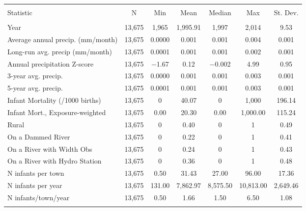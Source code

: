 
\begin{tabular}{@{\extracolsep{5pt}}lcccccc} 
\\[-1.8ex]\hline \\[-1.8ex] 
Statistic & \multicolumn{1}{c}{N} & \multicolumn{1}{c}{Min} & \multicolumn{1}{c}{Mean} & \multicolumn{1}{c}{Median} & \multicolumn{1}{c}{Max} & \multicolumn{1}{c}{St. Dev.} \\ 
\hline 
\hline \\[-1.8ex] 
Year & 13,675 & 1,965 & 1,995.91 & 1,997 & 2,014 & 9.53 \\ 
Average annual precip. (mm/month) & 13,675 & 0.0000 & 0.001 & 0.001 & 0.004 & 0.001 \\ 
Long-run avg. precip (mm/month) & 13,675 & 0.0001 & 0.001 & 0.001 & 0.002 & 0.001 \\ 
Annual precipitation Z-score & 13,675 & $-$1.67 & 0.12 & $-$0.002 & 4.99 & 0.95 \\ 
3-year avg. precip. & 13,675 & 0.0000 & 0.001 & 0.001 & 0.003 & 0.001 \\ 
5-year avg. precip. & 13,675 & 0.0001 & 0.001 & 0.001 & 0.003 & 0.001 \\ 
Infant Mortality (/1000 births) & 13,675 & 0 & 40.07 & 0 & 1,000 & 196.14 \\ 
Infant Mort., Exposure-weighted & 13,675 & 0.00 & 20.30 & 0.00 & 1,000.00 & 115.24 \\ 
Rural & 13,675 & 0 & 0.40 & 0 & 1 & 0.49 \\ 
On a Dammed River & 13,675 & 0 & 0.22 & 0 & 1 & 0.41 \\ 
On a River with Width Obs & 13,675 & 0 & 0.24 & 0 & 1 & 0.43 \\ 
On a River with Hydro Station & 13,675 & 0 & 0.36 & 0 & 1 & 0.48 \\ 
N infants per town & 13,675 & 0.50 & 31.43 & 27.00 & 96.00 & 17.36 \\ 
N infants per year & 13,675 & 131.00 & 7,862.97 & 8,575.50 & 10,813.00 & 2,649.46 \\ 
N infants/town/year & 13,675 & 0.50 & 1.66 & 1.50 & 6.50 & 1.08 \\ 
\hline 
\hline \\[-1.8ex] 
\end{tabular} 
